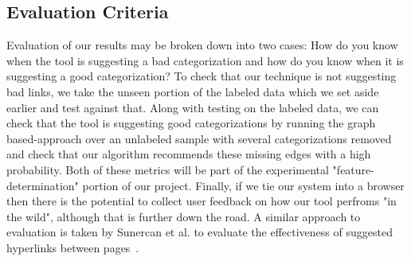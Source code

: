 \documentclass{sig-alternate}
\begin{document}
\subsection{Evaluation Criteria}
\label{subsec:eval_criteria}
Evaluation of our results may be broken down into two cases: How do you know when the tool is suggesting a bad categorization and how do you know when it is suggesting a good categorization? To check that our technique is not suggesting bad links, we take the unseen portion of the labeled data which we set aside earlier and test against that. Along with testing on the labeled data, we can check that the tool is suggesting good categorizations by running the graph based-approach over an unlabeled sample with several categorizations removed and check that our algorithm recommends these missing edges with a high probability. Both of these metrics will be part of the experimental "feature-determination" portion of our project. Finally, if we tie our system into a browser then there is the potential to collect user feedback on how our tool perfroms "in the wild", although that is further down the road. A similar approach to evaluation is taken by Sunercan et al.  to evaluate the effectiveness of suggested hyperlinks between pages~\cite{Sunercan}.
\end{document}
